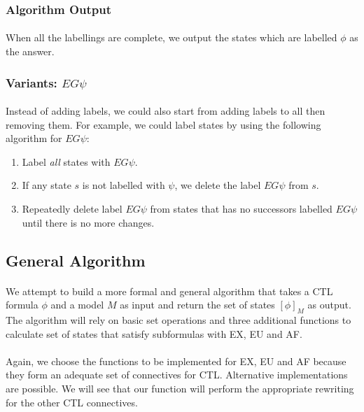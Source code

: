 \documentclass{article}
\theoremstyle{plain}
\theoremstyle{definition}
\begin{document}
\begin{multicols}{2}
\subsubsection{Algorithm Output}

\paragraph{} When all the labellings are complete, we output the states which are labelled $\phi$ as the answer. 

\subsubsection{Variants: $EG\psi$}

\paragraph{} Instead of adding labels, we could also start from adding labels to all then removing them. For example, we could label states by using the following algorithm for $EG\psi$:

\begin{enumerate}
\item Label \textit{all} states with $EG\psi$.
\item If any state $s$ is not labelled with $\psi$, we delete the label $EG\psi$ from $s$. 
\item Repeatedly delete label $EG\psi$ from states that has no successors labelled $EG\psi$ until there is no more changes.
\end{enumerate}

\subsection{General Algorithm}

\paragraph{} We attempt to build a more formal and general algorithm that takes a CTL formula $\phi$ and a model $M$ as input and return the set of states $[\phi]_M$ as output. The algorithm will rely on basic set operations and three additional functions to calculate set of states that satisfy subformulas with EX, EU and AF.

\paragraph{} Again, we choose the functions to be implemented for EX, EU and AF because they form an adequate set of connectives for CTL. Alternative implementations are possible. We will see that our function will perform the appropriate rewriting for the other CTL connectives.


\end{multicols}
\end{document}
